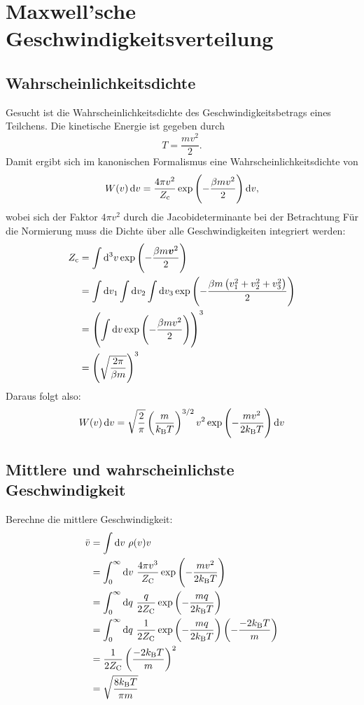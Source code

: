 \section{Maxwell'sche Geschwindigkeitsverteilung}

\subsection{Wahrscheinlichkeitsdichte}
Gesucht ist die Wahrscheinlichkeitsdichte des Geschwindigkeitsbetrags eines Teilchens. Die kinetische Energie ist gegeben durch
\[T=\frac{mv^2}{2}.\]
Damit ergibt sich im kanonischen Formalismus eine Wahrscheinlichkeitsdichte von
\[W(v) \dif v = \frac{4\pi v^2}{Z_\text c} \exp\del{-\frac{\beta mv^2}{2}} \dif v, \]
wobei sich der Faktor $4\pi v^2$ durch die Jacobideterminante bei der Betrachtung
Für die Normierung muss die Dichte über alle Geschwindigkeiten integriert werden:
\begin{align*}
Z_\text c &= \int \dif{}^3v \exp\del{-\frac{\beta m\vec{v}^2}{2}} \\
&= \int\dif v_1 \int\dif v_2 \int\dif v_3 \exp\del{-\frac{\beta m \del{ v_1^2+v_2^2+v_3^2}}{2}} \\
&= \del{\int \dif v \exp\del{-\frac{\beta m{v}^2}{2}}}^3 \\
&= \del{\sqrt{\frac{2\pi}{\beta m}}}^3
\end{align*}
Daraus folgt also:
\[W(v) \dif v = \sqrt{\frac{2}{\pi}} \del{\frac{m}{k_\text B T}}^{3/2} v^2 \exp\del{-\frac{mv^2}{2k_\text BT}} \dif v \]

\subsection{Mittlere und wahrscheinlichste Geschwindigkeit}
Berechne die mittlere Geschwindigkeit:
\begin{align*}
\bar{v} &= \int \dif v \ \rho(v) v \\
&= \int_0^\infty \dif v \ \frac{4\pi v^3}{Z_\text C} \exp\del{-\frac{mv^2}{2k_\text B T}} \\
&= \int_0^\infty \dif q \ \frac{q}{2Z_\text C} \exp\del{-\frac{mq}{2k_\text B T}} \\
&= \int_0^\infty \dif q \ \frac{1}{2Z_\text C} \exp\del{-\frac{mq}{2k_\text B T}}\del{-\frac{-2k_\text B T}{m}} \\
&= \frac{1}{2Z_\text C}\del{\frac{-2k_\text B T}{m}}^2 \\
&= \sqrt{\frac{8k_\text B T}{\pi m}}
\end{align*}

